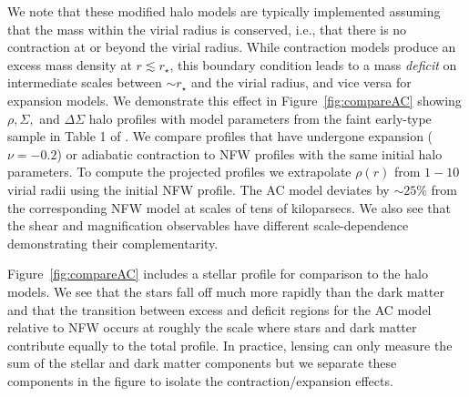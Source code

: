 \documentclass[12pt]{emulateapj}
\begin{document}
We note that these modified halo models are typically implemented
assuming that the mass within the virial radius is conserved, i.e.,
that there is no contraction at or beyond the virial radius. While
contraction models produce an excess mass density at $r \lesssim
r_{\star}$, this boundary condition leads to a mass \textit{deficit} on
intermediate scales between $\sim r_{\star}$ and the virial radius, and vice
versa for expansion models. We demonstrate this effect in
Figure~\ref{fig:compareAC} showing $\rho, \Sigma,$ and $\Delta\Sigma$
halo profiles with model parameters from the faint
early-type sample in Table 1 of \citet{Schulz2010}. We compare profiles that have
undergone expansion ($\nu=-0.2$) or adiabatic contraction to NFW
profiles with the same initial halo parameters. To compute the
projected profiles we extrapolate $\rho(r)$ from $1-10$ virial radii
using the initial NFW profile. The AC model deviates
by $\sim25\%$ from the corresponding NFW model at scales of tens of
kiloparsecs. We also see that the shear and magnification observables have
different scale-dependence demonstrating their complementarity.

\begin{figure*}[htb]
\caption{Density profiles for different halo models showing the
  effects of baryonic contraction or expansion relative to NFW. A
  Hernquist profile for the stellar component is included for
  comparison. Stellar and NFW model parameters are taken from the
  faint early-type sample in Table 1 of \citet{Schulz2010}: $z=0.11,
  M_{\star}=7\times10^{10}\,M_{\odot}, M_h=7\times10^{12}\,M_{\odot},
  c=9, R_{\rm deV}=3.9\,{\rm kpc}$ (physical). The AC model uses
  $\nu=1$ while the Expansion model has $\nu=-0.2$. The boundary
  condition specifying no contraction at the virial radius leads to a
  deficit (excess) in the AC (Expansion) profiles relative to NFW at
  $R_{\rm deV}\lesssim R\lesssim R_{\rm vir}$.}
\label{fig:compareAC}
\end{figure*}

Figure~\ref{fig:compareAC} includes a stellar profile for comparison
to the halo models. We see that the stars fall off much more rapidly
than the dark matter and that the transition between excess and
deficit regions for the AC model relative to NFW occurs at roughly the scale
where stars and dark matter contribute equally to the total
profile. In practice, lensing can only measure the sum of the stellar
and dark matter components but we separate these components in the
figure to isolate the contraction/expansion effects. 
\end{document}
